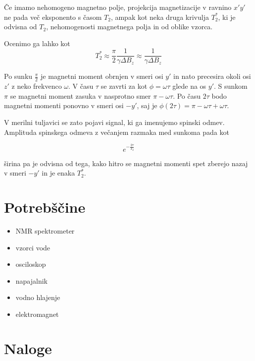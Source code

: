 \documentclass[11pt]{article}
\begin{document}
Če imamo nehomogeno magnetno polje, projekcija magnetizacije v ravnino \(x'y'\) ne pada več eksponento s časom \(T_2\), ampak kot neka druga krivulja \(T_2^{*}\), ki je odvisna od \(T_2\), nehomogenosti magnetnega polja in od oblike vzorca.

Ocenimo ga lahko kot
\begin{equation}
\label{eq:5}
T_2^{*} \approx \frac{\pi}{2} \frac{1}{\gamma \Delta B_z} \approx \frac{1}{\gamma \Delta B_z}
\end{equation}

Po sunku \(\frac{\pi}{2}\) je magnetni moment obrnjen v smeri osi \(y'\) in nato precesira okoli osi \(z'\) z neko frekvenco \(\omega\). V času \(\tau\) se zavrti za kot \(\phi = \omega \tau\) glede na os \(y'\). S sunkom \(\pi\) se magnetni moment zasuka v nasprotno smer \(\pi - \omega \tau\). Po času \(2\tau\) bodo magnetni momenti ponovno v smeri osi \(-y'\), saj je \(\phi(2\tau) = \pi - \omega \tau + \omega \tau\).

V merilni tuljavici se zato pojavi signal, ki ga imenujemo spinski odmev. Amplituda spinskega odmeva z večanjem razmaka med sunkoma pada kot

\[ e ^{-\frac{2\tau}{T_2}}
\]

širina pa je odvisna od tega, kako hitro se magnetni momenti spet zberejo nazaj v smeri \(-y'\) in je enaka \(T_2^{*}\).
\section{Potrebščine}\label{sec:org02fc6c0}

\begin{itemize}
\item NMR spektrometer
\item vzorci vode
\item osciloskop
\item napajalnik
\item vodno hlajenje
\item elektromagnet
\end{itemize}
\section{Naloge}\label{sec:org4d45467}
\end{document}
